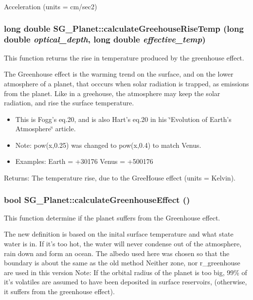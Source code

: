 Acceleration (units = cm/sec2) 
\subsubsection{\setlength{\rightskip}{0pt plus 5cm}long double SG\_\-Planet::calculate\-Greehouse\-Rise\-Temp (long double {\em optical\_\-depth}, long double {\em effective\_\-temp})\hspace{0.3cm}{\tt  [protected]}}\label{class_s_g___planet_b23}


This function returns the rise in temperature produced by the greenhouse effect. 

The Greenhouse effect is the warming trend on the surface, and on the lower atmosphere of a planet, that occcurs when solar radiation is trapped, as emissions from the planet. Like in a greehouse, the atmosphere may keep the solar radiation, and rise the surface temperature.\begin{itemize}
\item This is Fogg's eq.20, and is also Hart's eq.20 in his \char`\"{}Evolution of Earth's Atmosphere\char`\"{} article.\item Note: pow(x,0.25) was changed to pow(x,0.4) to match Venus.\item Examples: Earth = +30176 Venus = +500176\end{itemize}


\begin{Desc}
\item[Returns:]The temperature rise, due to the Gree\-House effect (units = Kelvin). \end{Desc}
\subsubsection{\setlength{\rightskip}{0pt plus 5cm}bool SG\_\-Planet::calculate\-Greenhouse\-Effect ()\hspace{0.3cm}{\tt  [protected]}}\label{class_s_g___planet_b15}


This function determine if the planet suffers from the Greenhouse effect. 

The new definition is based on the inital surface temperature and what state water is in. If it's too hot, the water will never condense out of the atmosphere, rain down and form an ocean. The albedo used here was chosen so that the boundary is about the same as the old method Neither zone, nor r\_\-greenhouse are used in this version Note: If the orbital radius of the planet is too big, 99\% of it's volatiles are assumed to have been deposited in surface reservoirs, (otherwise, it suffers from the greenhouse effect). 
